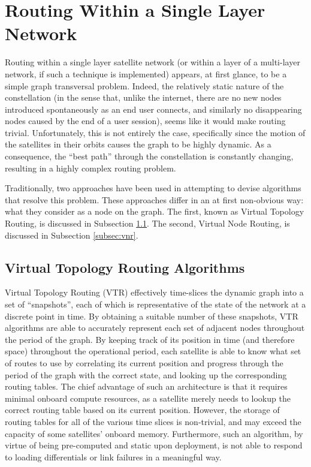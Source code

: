 
\section{Routing Within a Single Layer Network}\label{sec:singleLayer}
Routing within a single layer satellite network (or within a layer of a multi-layer network, if such a technique is implemented) appears, at first glance, to be a simple graph transversal problem. Indeed, the relatively static nature of the constellation (in the sense that, unlike the internet, there are no new nodes introduced spontaneously as an end user connects, and similarly no disappearing nodes caused by the end of a user session), seems like it would make routing trivial. Unfortunately, this is not entirely the case, specifically since the motion of the satellites in their orbits causes the graph to be highly dynamic. As a consequence, the ``best path'' through the constellation is constantly changing, resulting in a highly complex routing problem.

Traditionally, two approaches have been used in attempting to devise algorithms that resolve this problem. These approaches differ in an at first non-obvious way: what they consider as a node on the graph. The first, known as Virtual Topology Routing, is discussed in Subsection \ref{subsec:vtr}. The second, Virtual Node Routing, is discussed in Subsection \ref{subsec:vnr}.

\subsection{Virtual Topology Routing Algorithms}\label{subsec:vtr}
Virtual Topology Routing (VTR) effectively time-slices the dynamic graph into a set of ``snapshots'', each of which is representative of the state of the network at a discrete point in time. By obtaining a suitable number of these snapshots, VTR algorithms are able to accurately represent each set of adjacent nodes throughout the period of the graph. By keeping track of its position in time (and therefore space) throughout the operational period, each satellite is able to know what set of routes to use by correlating its current position and progress through the period of the graph with the correct state, and looking up the corresponding routing tables. The chief advantage of such an architecture is that it requires minimal onboard compute resources, as a satellite merely needs to lookup the correct routing table based on its current position. However, the storage of routing tables for all of the various time slices is non-trivial, and may exceed the capacity of some satellites' onboard memory. Furthermore, such an algorithm, by virtue of being pre-computed and static upon deployment, is not able to respond to loading differentials or link failures in a meaningful way.

